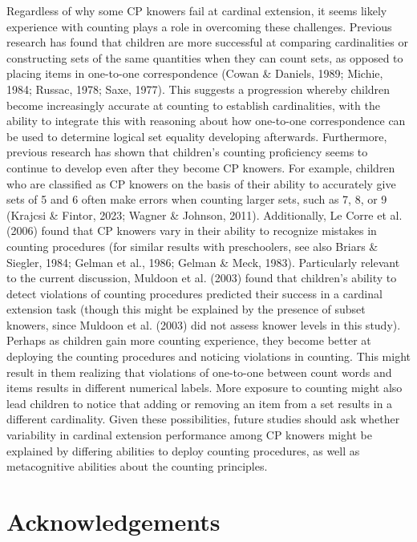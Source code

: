 \documentclass[
  man,floatsintext]{apa7}
\begin{document}
Regardless of why some CP knowers fail at cardinal extension, it seems likely experience with counting plays a role in overcoming these challenges. Previous research has found that children are more successful at comparing cardinalities or constructing sets of the same quantities when they can count sets, as opposed to placing items in one-to-one correspondence (Cowan \& Daniels, 1989; Michie, 1984; Russac, 1978; Saxe, 1977). This suggests a progression whereby children become increasingly accurate at counting to establish cardinalities, with the ability to integrate this with reasoning about how one-to-one correspondence can be used to determine logical set equality developing afterwards. Furthermore, previous research has shown that children's counting proficiency seems to continue to develop even after they become CP knowers. For example, children who are classified as CP knowers on the basis of their ability to accurately give sets of 5 and 6 often make errors when counting larger sets, such as 7, 8, or 9 (Krajcsi \& Fintor, 2023; Wagner \& Johnson, 2011). Additionally, Le Corre et al. (2006) found that CP knowers vary in their ability to recognize mistakes in counting procedures (for similar results with preschoolers, see also Briars \& Siegler, 1984; Gelman et al., 1986; Gelman \& Meck, 1983). Particularly relevant to the current discussion, Muldoon et al. (2003) found that children's ability to detect violations of counting procedures predicted their success in a cardinal extension task (though this might be explained by the presence of subset knowers, since Muldoon et al. (2003) did not assess knower levels in this study). Perhaps as children gain more counting experience, they become better at deploying the counting procedures and noticing violations in counting. This might result in them realizing that violations of one-to-one between count words and items results in different numerical labels. More exposure to counting might also lead children to notice that adding or removing an item from a set results in a different cardinality. Given these possibilities, future studies should ask whether variability in cardinal extension performance among CP knowers might be explained by differing abilities to deploy counting procedures, as well as metacognitive abilities about the counting principles.

\newpage

\hypertarget{acknowledgements}{%
\section{Acknowledgements}\label{acknowledgements}}
\end{document}
